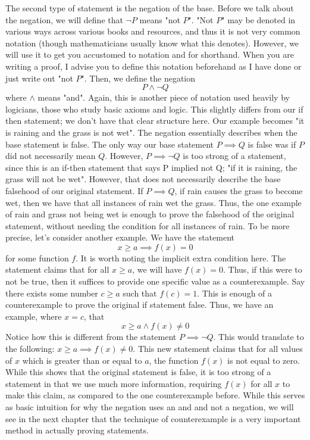 The second type of statement is the negation of the base. Before we talk about the negation, we will define that $\neg P$ means "not $P$".  "Not $P$" may be denoted in various ways across various books and resources, and thus it is not very common notation (though mathematicians usually know what this denotes). However, we will use it to get you accustomed to notation and for shorthand. When you are writing a proof, I advise you to define this notation beforehand as I have done or just write out "not $P$". Then, we define the negation 
\[P \land \neg Q\] 
\noindent where $\land$ means "and". Again, this is another piece of notation used heavily by logicians, those who study basic axioms and logic. This slightly differs from our if then statement; we don't have that clear structure here. Our example becomes "it is raining and the grass is not wet". The negation essentially describes when the base statement is false. The only way our base statement $P \implies Q$ is false was if $P$ did not necessarily mean $Q$. However, $P \implies \neg Q$ is too strong of a statement, since this is an if-then statement that says P implied not Q; "if it is raining, the grass will not be wet". However, that does not necessarily describe the base falsehood of our original statement. If $P \implies Q$, if rain causes the grass to become wet, then we have that all instances of rain wet the grass. Thus, the one example of rain and grass not being wet is enough to prove the falsehood of the original statement, without needing the condition for all instances of rain. To be more precise, let's consider another example. We have the statement 
\[x \geq a \implies f(x) =0\]
\noindent for some function $f$. It is worth noting the implicit extra condition here. The statement claims that for all $x \geq a$, we will have $f(x)=0$. Thus, if this were to not be true, then it suffices to provide one specific value as a counterexample. Say there exists some number $c \geq a$ such that $f(c)=1$. This is enough of a counterexample to prove the original if statement false. Thus, we have an example, where $x=c$, that \[
x \geq a \land f(x) \neq0
\]
\noindent Notice how this is different from the statement $P \implies \neg Q$. This would translate to the following: $x \geq a \implies f(x) \neq 0$. This new statement claims that for all values of $x$ which is greater than or equal to $a$, the function $f(x)$ is not equal to zero. While this shows that the original statement is false, it is too strong of a statement in that we use much more information, requiring $f(x)$ for all $x$ to make this claim, as compared to the one counterexample before. While this serves as basic intuition for why the negation uses an and and not a negation, we will see in the next chapter that the technique of counterexample is a very important method in actually proving statements. 

